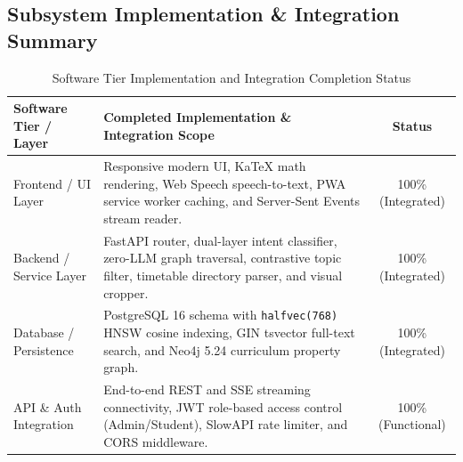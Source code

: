 \documentclass[11pt, a4paper]{article}
\begin{document}
\subsection{Subsystem Implementation \& Integration Summary}
\begin{table}[H]
    \centering
    \footnotesize
    \renewcommand{\arraystretch}{1.25}
    \begin{tabular}{|p{3.5cm}|p{7.8cm}|c|}
        \hline
        \textbf{Software Tier / Layer} & \textbf{Completed Implementation \& Integration Scope} & \textbf{Status} \\
        \hline
        Frontend / UI Layer & Responsive modern UI, KaTeX math rendering, Web Speech speech-to-text, PWA service worker caching, and Server-Sent Events stream reader. & 100\% (Integrated) \\
        \hline
        Backend / Service Layer & FastAPI router, dual-layer intent classifier, zero-LLM graph traversal, contrastive topic filter, timetable directory parser, and visual cropper. & 100\% (Integrated) \\
        \hline
        Database / Persistence & PostgreSQL 16 schema with \texttt{halfvec(768)} HNSW cosine indexing, GIN tsvector full-text search, and Neo4j 5.24 curriculum property graph. & 100\% (Integrated) \\
        \hline
        API \& Auth Integration & End-to-end REST and SSE streaming connectivity, JWT role-based access control (Admin/Student), SlowAPI rate limiter, and CORS middleware. & 100\% (Functional) \\
        \hline
    \end{tabular}
    \caption{Software Tier Implementation and Integration Completion Status}
\end{table}
\end{document}
